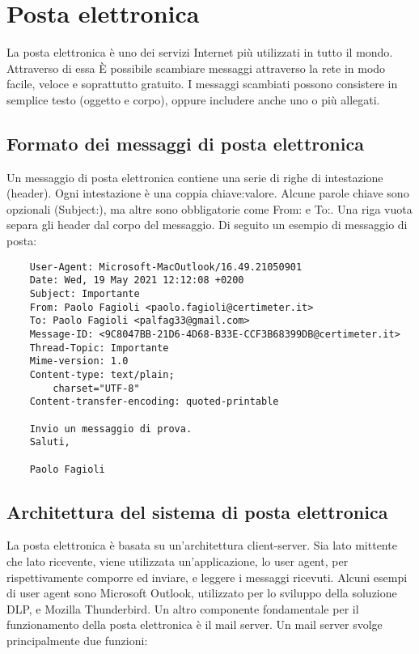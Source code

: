 \pagebreak
\section{Posta elettronica}
La posta elettronica è uno dei servizi Internet più utilizzati in tutto il mondo\cite{posta}. Attraverso di essa
È possibile scambiare messaggi attraverso la rete in modo facile, veloce e soprattutto gratuito. 
I messaggi scambiati possono consistere in semplice testo (oggetto e corpo), 
oppure includere anche uno o più allegati.

\subsection{Formato dei messaggi di posta elettronica}
Un messaggio di posta elettronica contiene una serie di righe di intestazione (header).
Ogni intestazione è una coppia chiave:valore. Alcune parole chiave sono opzionali (Subject:), 
ma altre sono obbligatorie come From: e To:. Una riga vuota separa gli header dal corpo del messaggio.
Di seguito un esempio di messaggio di posta:

\begin{verbatim}
    User-Agent: Microsoft-MacOutlook/16.49.21050901
    Date: Wed, 19 May 2021 12:12:08 +0200
    Subject: Importante
    From: Paolo Fagioli <paolo.fagioli@certimeter.it>
    To: Paolo Fagioli <palfag33@gmail.com>
    Message-ID: <9C8047BB-21D6-4D68-B33E-CCF3B68399DB@certimeter.it>
    Thread-Topic: Importante
    Mime-version: 1.0
    Content-type: text/plain;
        charset="UTF-8"
    Content-transfer-encoding: quoted-printable

    Invio un messaggio di prova.
    Saluti,

    Paolo Fagioli
\end{verbatim}

\subsection{Architettura del sistema di posta elettronica}
La posta elettronica è basata su un'architettura client-server. 
Sia lato mittente che lato ricevente, viene utilizzata un'applicazione, lo user agent, per rispettivamente 
comporre ed inviare, e leggere i messaggi ricevuti. 
Alcuni esempi di user agent sono Microsoft Outlook, utilizzato per lo sviluppo della soluzione DLP, 
e Mozilla Thunderbird.
Un altro componente fondamentale per il funzionamento della posta elettronica è il mail server. 
Un mail server svolge principalmente due funzioni:

